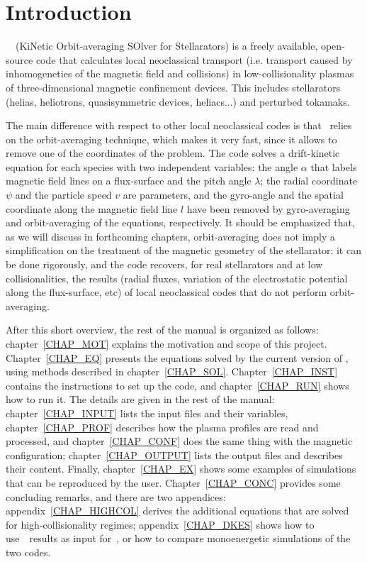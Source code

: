 \chapter{Introduction}

\KNOSOS~~(KiNetic Orbit-averaging SOlver for Stellarators) is a freely available, open-source code that calculates local neoclassical transport (i.e. transport caused by inhomogeneties of the magnetic field and collisions) in low-collisionality plasmas of three-dimensional magnetic confinement devices. This includes stellarators (helias, heliotrons, quasisymmetric devices, heliacs...) and perturbed tokamaks.

The main difference with respect to other local neoclassical codes is that \KNOSOS~relies on the orbit-averaging technique, which makes it very fast, since it allows to remove one of the coordinates of the problem. The code solves a drift-kinetic equation for each species with two independent variables: the angle $\alpha$ that labels magnetic field lines on a flux-surface and the pitch angle $\lambda$; the radial coordinate $\psi$ and the particle speed $v$ are parameters, and the gyro-angle and the spatial coordinate along the magnetic field line $l$ have been removed by gyro-averaging and orbit-averaging of the equations, respectively. It should be emphasized that, as we will discuss in forthcoming chapters, orbit-averaging does not imply a simplification on the treatment of the magnetic geometry of the stellarator: it can be done rigorously, and the code recovers, for real stellarators and at low collisionalities, the results (radial fluxes, variation of the electrostatic potential along the flux-surface, etc) of local neoclassical codes that do not perform orbit-averaging.

After this short overview, the rest of the manual is organized as follows: chapter~\ref{CHAP_MOT} explains the motivation and scope of this project. Chapter~\ref{CHAP_EQ} presents the equations solved by the current version of \KNOSOS, using methods described in chapter~\ref{CHAP_SOL}. Chapter~\ref{CHAP_INST} contains the instructions to set up the code, and chapter~\ref{CHAP_RUN} shows how to run it. The details are given in the rest of the manual: chapter~\ref{CHAP_INPUT} lists the input files and their variables, chapter~\ref{CHAP_PROF} describes how the plasma profiles are read and processed, and chapter~\ref{CHAP_CONF} does the same thing with the magnetic configuration; chapter~\ref{CHAP_OUTPUT} lists the output files and describes their content. Finally, chapter~\ref{CHAP_EX} shows some examples of simulations that can be reproduced by the user. Chapter~\ref{CHAP_CONC} provides some concluding remarks, and there are two appendices: appendix~\ref{CHAP_HIGHCOL} derives the additional equations that are solved for high-collisionality regimes; appendix~\ref{CHAP_DKES} shows how to use~\DKES~results as input for~\KNOSOS, or how to compare monoenergetic simulations of the two codes.

